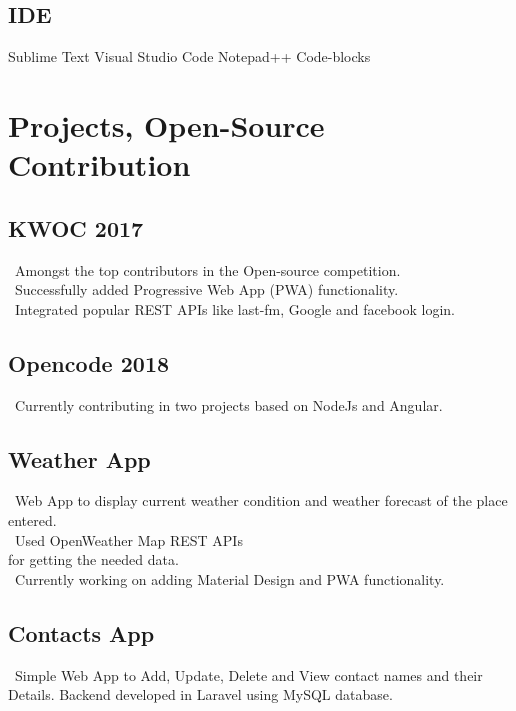 \documentclass[]{deedy-resume-openfont}
\begin{document}
\begin{minipage}[t]{0.33\textwidth}
\sectionsep

\subsection{IDE}
Sublime Text \textbullet{} Visual Studio Code \newline \textbullet{} Notepad++ \textbullet{} Code-blocks 

\sectionsep

\section{Projects, Open-Source Contribution}

\subsection{KWOC 2017}
\textbullet\  Amongst the top contributors in the Open-source competition.\\
\textbullet\ Successfully added Progressive Web App (PWA) functionality.\\
\textbullet\ Integrated popular REST APIs like last-fm, Google and facebook login.
\sectionsep

\subsection{Opencode 2018}
\textbullet\  Currently contributing in two projects based on NodeJs and Angular.\\
\sectionsep

\subsection{Weather App}
\textbullet\  Web App to display current weather condition and weather forecast of the place entered.\\
\textbullet\ Used OpenWeather Map REST APIs \\for getting the needed data.\\
\textbullet\ Currently working on adding Material Design and PWA functionality.
\sectionsep

\subsection{Contacts App }
\textbullet\  Simple Web App to Add, Update, Delete and View contact names and their Details. Backend developed
in Laravel using MySQL database.\\
\sectionsep




\end{minipage}
\end{document}
